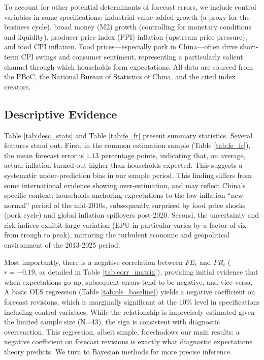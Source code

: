 \documentclass[12pt]{article}
\begin{document}
To account for other potential determinants of forecast errors, we include control variables in some specifications: industrial value added growth (a proxy for the business cycle), broad money (M2) growth (controlling for monetary conditions and liquidity), producer price index (PPI) inflation (upstream price pressure), and food CPI inflation. Food prices—especially pork in China—often drive short-term CPI swings and consumer sentiment, representing a particularly salient channel through which households form expectations. All data are sourced from the PBoC, the National Bureau of Statistics of China, and the cited index creators.

\subsection{Descriptive Evidence}
Table \ref{tab:desc_stats} and Table \ref{tab:fe_fr} present summary statistics. Several features stand out. First, in the common estimation sample (Table \ref{tab:fe_fr}), the mean forecast error is $1.13$ percentage points, indicating that, on average, actual inflation turned out higher than households expected. This suggests a systematic under-prediction bias in our sample period. This finding differs from some international evidence showing over-estimation, and may reflect China's specific context: households anchoring expectations to the low-inflation ``new normal'' period of the mid-2010s, subsequently surprised by food price shocks (pork cycle) and global inflation spillovers post-2020. Second, the uncertainty and risk indices exhibit large variation (EPU in particular varies by a factor of six from trough to peak), mirroring the turbulent economic and geopolitical environment of the 2013-2025 period.

Most importantly, there is a negative correlation between $FE_t$ and $FR_t$ ($r=-0.19$, as detailed in Table \ref{tab:corr_matrix}), providing initial evidence that when expectations go up, subsequent errors tend to be negative, and vice versa. A basic OLS regression (Table \ref{tab:ols_baseline}) yields a negative coefficient on forecast revisions, which is marginally significant at the 10\% level in specifications including control variables. While the relationship is imprecisely estimated given the limited sample size (N=43), the sign is consistent with diagnostic overreaction. This regression, albeit simple, foreshadows our main results: a negative coefficient on forecast revisions is exactly what diagnostic expectations theory predicts. We turn to Bayesian methods for more precise inference.
\end{document}
